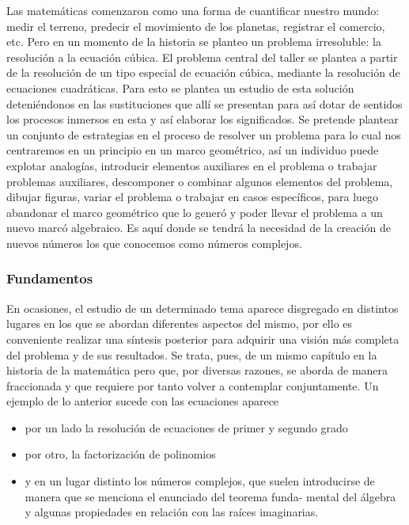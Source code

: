 Las matemáticas comenzaron como una forma de cuantificar nuestro mundo: medir el terreno, predecir el movimiento de los planetas, registrar el comercio, etc. Pero en un momento de la historia se planteo un problema irresoluble: la resolución a la ecuación cúbica. El problema central del taller se plantea a partir de la resolución de un tipo especial de ecuación cúbica, mediante la resolución de ecuaciones cuadráticas. Para esto se plantea un estudio de esta solución deteniéndonos en las sustituciones que allí se presentan para así dotar de sentidos los procesos inmersos en esta y así elaborar los significados. Se pretende plantear un conjunto de estrategias en el proceso de resolver un problema para lo cual nos centraremos en un principio en un marco geométrico, así un individuo puede explotar analogías, introducir elementos auxiliares en el problema o trabajar problemas auxiliares, descomponer o combinar algunos elementos del problema, dibujar figuras, variar el problema o trabajar en casos específicos, para luego abandonar el marco geométrico que lo generó y poder llevar el problema a un nuevo marcó algebraico. Es aquí donde se tendrá la necesidad de la creación de nuevos números los que conocemos como números complejos. 

\subsubsection{Fundamentos}

En ocasiones, el estudio de un determinado tema aparece disgregado en distintos lugares en los que se abordan diferentes aspectos del mismo, por ello es conveniente realizar una síntesis posterior para adquirir una visión más completa del problema y de sus resultados. Se trata, pues, de un mismo capítulo en la historia de la matemática pero que, por diversas razones, se aborda de manera fraccionada y que requiere por tanto volver a contemplar conjuntamente. Un ejemplo de lo anterior sucede con las ecuaciones aparece
\begin{itemize}
	\item por un lado la resolución de ecuaciones de primer y segundo grado
	\item por otro, la factorización de polinomios
	\item y en un lugar distinto los números complejos, que suelen introducirse de manera que se menciona el enunciado del teorema funda- mental del álgebra y algunas propiedades en relación con las raíces imaginarias. 
\end{itemize}

